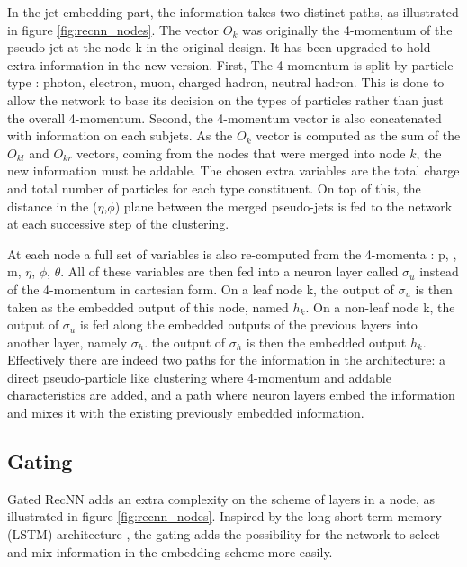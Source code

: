 In the jet embedding part, the information takes two distinct paths, as illustrated in figure \ref{fig:recnn_nodes}.
The vector $O_k$ was originally the 4-momentum of the pseudo-jet at the node k in the original design. It has been upgraded to hold extra information in the new version. First, The 4-momentum is split by particle type : photon, electron, muon, charged hadron, neutral hadron. This is done to allow the network to base its decision on the types of particles rather than just the overall 4-momentum. Second, the 4-momentum vector is also concatenated with information on each subjets. As the $O_k$ vector is computed as the sum of the $O_{kl}$ and $O_{kr}$ vectors, coming from the nodes that were merged into node $k$, the new information must be addable. The chosen extra variables are the total charge and total number of particles for each type constituent. On top of this, the distance in the ($\eta$,$\phi$) plane between the merged pseudo-jets is fed to the network at each successive step of the clustering. 

At each node a full set of variables is also re-computed from the 4-momenta : p, \pt, m, $\eta$, $\phi$, $\theta$. All of these variables are then fed into a neuron layer called $\sigma_{u}$ instead of the 4-momentum in cartesian form.
On a leaf node k, the output of $\sigma_{u}$ is then taken as the embedded output of this node, named $h_k$.
On a non-leaf node k, the output of $\sigma_{u}$ is fed along the embedded outputs of the previous layers into another layer, namely $\sigma_h$. the output of $\sigma_h$ is then the embedded output $h_k$.
Effectively there are indeed two paths for the information in the architecture: a direct pseudo-particle like clustering where 4-momentum and addable characteristics are added, and a path where neuron layers embed the information and mixes it with the existing previously embedded information.

\subsection{Gating}

Gated RecNN adds an extra complexity on the scheme of layers in a node, as illustrated in figure \ref{fig:recnn_nodes}. Inspired by the long short-term memory (LSTM) architecture \cite{lstm}, the gating adds the possibility for the network to select and mix information in the embedding scheme more easily. 

